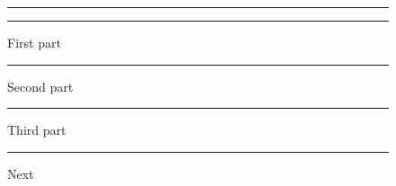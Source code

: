 \documentclass{article}
\begin{document}
\begin{figure}
\begin{minipage}{.4\linewidth}\rule{1cm}{1cm}\end{minipage}
\begin{minipage}{.4\linewidth}\rule{1cm}{1cm}\end{minipage}
\caption{First part}
\end{figure}
\begin{figure}\ContinuedFloat
\begin{minipage}{.4\linewidth}\rule{1cm}{1cm}\end{minipage}
\caption{Second part}
\end{figure}
\begin{figure}\ContinuedFloat
\begin{minipage}{.4\linewidth}\rule{1cm}{1cm}\end{minipage}
\caption{Third part}
\end{figure}
\begin{figure}\rule{1cm}{1cm}\caption{Next}\end{figure}
\end{document}
